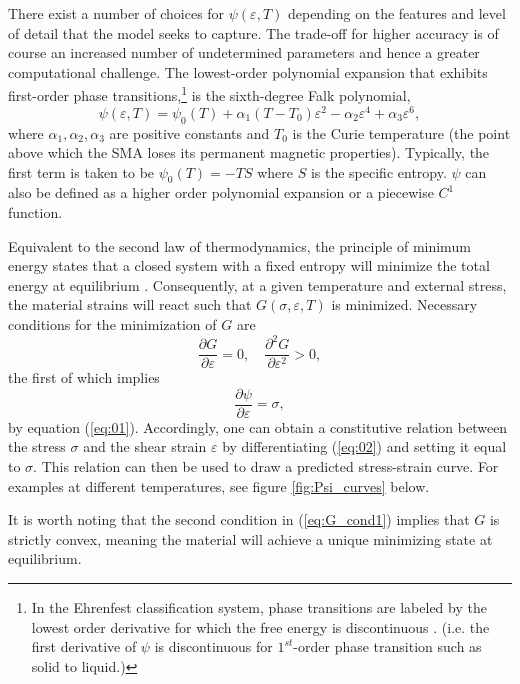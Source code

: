 \begin{multicols}{2}
There exist a number of choices for $\psi(\varepsilon, T)$ depending on the features and level of detail that the model seeks to capture. The trade-off for higher accuracy is of course an increased number of undetermined parameters and hence a greater computational challenge. The lowest-order polynomial expansion that exhibits first-order phase transitions,\footnote{In the Ehrenfest classification system, phase transitions are labeled by the lowest order derivative for which the free energy is discontinuous \cite{blundell2010concepts}. (i.e. the first derivative of $\psi$ is discontinuous for $1^{st}$-order phase transition such as solid to liquid.)} is the sixth-degree Falk polynomial,
\begin{equation} \label{eq:02}
    \psi(\varepsilon, T) = \psi_0(T) + \alpha_1(T - T_0)\varepsilon^2 - \alpha_2\varepsilon^4 + \alpha_3\varepsilon^6,
\end{equation}
where $\alpha_1, \alpha_2, \alpha_3$  are positive constants and $T_0$ is the Curie temperature (the point above which the SMA loses its permanent magnetic properties). Typically, the first term is taken to be $\psi_0(T) = -TS$ where $S$ is the specific entropy. $\psi$ can also be defined as a higher order polynomial expansion or a piecewise $C^1$ function.

Equivalent to the second law of thermodynamics, the principle of minimum energy states that a closed system with a fixed entropy will minimize the total energy at equilibrium \cite{callen1985thermodynamics}. Consequently, at a given temperature and external stress, the material strains will react such that $G(\sigma, \varepsilon, T)$ is minimized. Necessary conditions for the minimization of $G$ are
\begin{equation} \label{eq:G_cond1}
    \frac{\partial G}{\partial \varepsilon} = 0, \quad \frac{\partial^2 G}{\partial\varepsilon^2} > 0,
\end{equation}
the first of which implies
\begin{equation} \label{eq:psi_cond}
    \frac{\partial \psi}{\partial \varepsilon} = \sigma,
\end{equation}
by equation (\ref{eq:01}). Accordingly, one can obtain a constitutive relation between the stress $\sigma$ and the shear strain $\varepsilon$ by differentiating (\ref{eq:02}) and setting it equal to $\sigma$. This relation can then be used to draw a predicted stress-strain curve. For examples at different temperatures, see figure \ref{fig:Psi_curves} below.

It is worth noting that the second condition in (\ref{eq:G_cond1}) implies that $G$ is strictly convex, meaning the material will achieve a unique minimizing state at equilibrium. 


\end{multicols}

